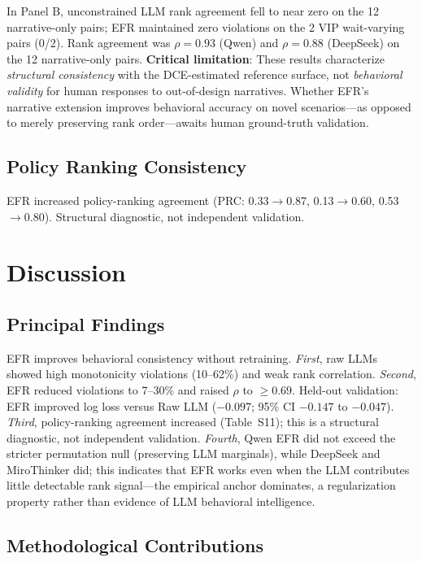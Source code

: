 \documentclass[12pt]{article}
\begin{document}
In Panel B, unconstrained LLM rank agreement fell to near zero on the 12 narrative-only pairs; EFR maintained zero violations on the 2 VIP wait-varying pairs (0/2). Rank agreement was $\rho = 0.93$ (Qwen) and $\rho = 0.88$ (DeepSeek) on the 12 narrative-only pairs. \textbf{Critical limitation}: These results characterize \emph{structural consistency} with the DCE-estimated reference surface, not \emph{behavioral validity} for human responses to out-of-design narratives. Whether EFR's narrative extension improves behavioral accuracy on novel scenarios---as opposed to merely preserving rank order---awaits human ground-truth validation.




\subsection{Policy Ranking Consistency}
\label{sec:policy_ranking}

EFR increased policy-ranking agreement (PRC: 0.33$\to$0.87, 0.13$\to$0.60, 0.53$\to$0.80). Structural diagnostic, not independent validation.

\section{Discussion}
\subsection{Principal Findings}

EFR improves behavioral consistency without retraining. \emph{First}, raw LLMs showed high monotonicity violations (10--62\%) and weak rank correlation. \emph{Second}, EFR reduced violations to 7--30\% and raised $\rho$ to $\geq 0.69$. Held-out validation: EFR improved log loss versus Raw LLM ($-0.097$; 95\% CI $-0.147$ to $-0.047$). \emph{Third}, policy-ranking agreement increased (Table~S11); this is a structural diagnostic, not independent validation. \emph{Fourth}, Qwen EFR did not exceed the stricter permutation null (preserving LLM marginals), while DeepSeek and MiroThinker did; this indicates that EFR works even when the LLM contributes little detectable rank signal---the empirical anchor dominates, a regularization property rather than evidence of LLM behavioral intelligence.

\subsection{Methodological Contributions}
\end{document}
